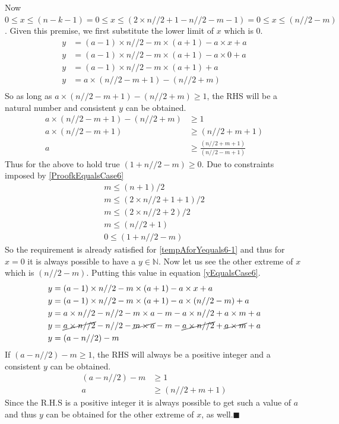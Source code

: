 \documentclass[12pt, twoside]{article}
\begin{document}
Now $0 \leq x \leq (n-k-1) = 0 \leq x \leq (2\times n//2+1-n//2-m-1) = 0 \leq x \leq (n//2 -m)$. Given this premise, we first substitute the lower limit of $x$ which is $0$.
\begin{align*}
	y &= (a-1)\times n//2 -m\times(a+1) - a\times x + a \\
	y &= (a-1)\times n//2 -m\times(a+1) - a\times 0 + a \\
	y &= (a-1)\times n//2 -m\times(a+1) + a \\
	y &= a\times(n//2-m+1) - (n//2+m) \\
\end{align*}
So as long as $a\times(n//2-m+1) - (n//2+m) \geq 1$, the RHS will be a natural number and consistent $y$ can be obtained.
\begin{align}
	a\times(n//2-m+1) - (n//2+m) &\geq 1 \nonumber \\
	a\times(n//2-m+1) &\geq (n//2+m+1) \nonumber \\
	a &\geq \frac{(n//2+m+1)}{(n//2-m+1)} \label{tempAforYequals6-1}
\end{align}
Thus for the above to hold true $(1+n//2-m) \geq 0$.\newline
Due to constraints imposed by \eqref{ProofkEqualsCase6} 
\begin{align*}
	m \leq (n+1)/2 \\
	m \leq (2\times n//2 + 1 +1)/2 \\
	m \leq (2\times n//2 + 2)/2 \\
	m \leq (n//2+1) \\
	0 \leq (1+n//2-m)
\end{align*}
So the requirement is already satisfied for \eqref{tempAforYequals6-1} and thus for $x=0$ it is always possible to have a $y \in \mathbb{N}$. Now let us see the other extreme of $x$ which is $(n//2-m)$. Putting this value in equation \eqref{yEqualsCase6}.
\begin{align*}
	y &= (a-1)\times n//2 -m\times(a+1) - a\times x + a \\
	y &= (a-1)\times n//2 -m\times(a+1) - a\times(n//2-m) + a\\
	y &= a\times n//2 -n//2 -m\times a - m -a\times n//2 +a\times m + a \\
	y &= \cancel{a\times n//2} -n//2 -\cancel{m\times a} - m -\cancel{a\times n//2} +\cancel{a\times m} + a \\
	y &= (a - n//2) -m 
\end{align*}
If $(a - n//2) -m \geq 1$, the RHS will always be a positive integer and a consistent $y$ can be obtained.
\begin{align}
	(a - n//2) -m  &\geq 1 \nonumber \\
	a &\geq (n//2+m+1) \label{tempAforYequals6-2}
\end{align}
Since the R.H.S is a positive integer it is always possible to get such a value of $a$ and thus $y$ can be obtained for the other extreme of $x$, as well.$\blacksquare$
\end{document}
